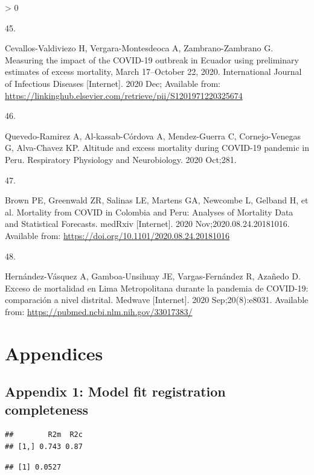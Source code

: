 \documentclass[
]{article}
\newlength{\cslhangindent}
\newlength{\csllabelwidth}
\newenvironment{CSLReferences}[2] %
 {%
  \setlength{\parindent}{0pt}
  \ifodd #1 \everypar{\setlength{\hangindent}{\cslhangindent}}\ignorespaces\fi
  \ifnum #2 > 0
  \setlength{\parskip}{#2\baselineskip}
  \fi
 }%
 {}
\newcommand{\CSLLeftMargin}[1]{\parbox[t]{\csllabelwidth}{#1}}
\newcommand{\CSLRightInline}[1]{\parbox[t]{\linewidth - \csllabelwidth}{#1}\break}
\begin{document}
\begin{CSLReferences}{0}{0}
\leavevmode\hypertarget{ref-Cevallos2020}{}%
\CSLLeftMargin{45. }
\CSLRightInline{Cevallos-Valdiviezo H, Vergara-Montesdeoca A, Zambrano-Zambrano G. {Measuring the impact of the COVID-19 outbreak in Ecuador using preliminary estimates of excess mortality, March 17--October 22, 2020}. International Journal of Infectious Diseases {[}Internet{]}. 2020 Dec; Available from: \url{https://linkinghub.elsevier.com/retrieve/pii/S1201971220325674}}

\leavevmode\hypertarget{ref-Quevedo2020}{}%
\CSLLeftMargin{46. }
\CSLRightInline{Quevedo-Ramirez A, Al-kassab-Córdova A, Mendez-Guerra C, Cornejo-Venegas G, Alva-Chavez KP. {Altitude and excess mortality during COVID-19 pandemic in Peru}. Respiratory Physiology and Neurobiology. 2020 Oct;281. }

\leavevmode\hypertarget{ref-Brown2020}{}%
\CSLLeftMargin{47. }
\CSLRightInline{Brown PE, Greenwald ZR, Salinas LE, Martens GA, Newcombe L, Gelband H, et al. {Mortality from COVID in Colombia and Peru: Analyses of Mortality Data and Statistical Forecasts}. medRxiv {[}Internet{]}. 2020 Nov;2020.08.24.20181016. Available from: \url{https://doi.org/10.1101/2020.08.24.20181016}}

\leavevmode\hypertarget{ref-Hernandez2020}{}%
\CSLLeftMargin{48. }
\CSLRightInline{Hernández-Vásquez A, Gamboa-Unsihuay JE, Vargas-Fernández R, Azañedo D. {Exceso de mortalidad en Lima Metropolitana durante la pandemia de COVID-19: comparaci{ó}n a nivel distrital}. Medwave {[}Internet{]}. 2020 Sep;20(8):e8031. Available from: \url{https://pubmed.ncbi.nlm.nih.gov/33017383/}}

\end{CSLReferences}

\hypertarget{appendices}{%
\section{Appendices}\label{appendices}}

\hypertarget{appendix-1-model-fit-registration-completeness}{%
\subsection{Appendix 1: Model fit registration completeness}\label{appendix-1-model-fit-registration-completeness}}

\begin{verbatim}
##        R2m  R2c
## [1,] 0.743 0.87
\end{verbatim}

\begin{verbatim}
## [1] 0.0527
\end{verbatim}
\end{document}
